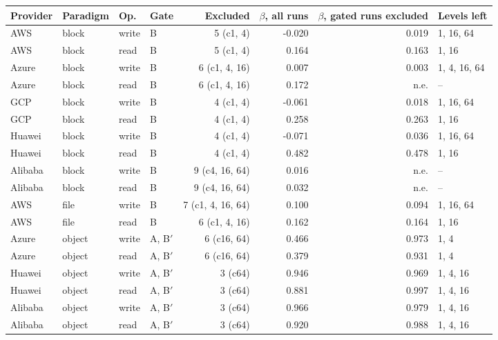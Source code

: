\begin{tabular}{llllrrrl}
\toprule
Provider & Paradigm & Op. & Gate & Excluded & $\beta$, all runs & $\beta$, gated runs excluded & Levels left \\
\midrule
AWS & block & write & B & 5 (c1, 4) & -0.020 & 0.019 & 1, 16, 64 \\
AWS & block & read & B & 5 (c1, 4) & 0.164 & 0.163 & 1, 16 \\
Azure & block & write & B & 6 (c1, 4, 16) & 0.007 & 0.003 & 1, 4, 16, 64 \\
Azure & block & read & B & 6 (c1, 4, 16) & 0.172 & n.e. & -- \\
GCP & block & write & B & 4 (c1, 4) & -0.061 & 0.018 & 1, 16, 64 \\
GCP & block & read & B & 4 (c1, 4) & 0.258 & 0.263 & 1, 16 \\
Huawei & block & write & B & 4 (c1, 4) & -0.071 & 0.036 & 1, 16, 64 \\
Huawei & block & read & B & 4 (c1, 4) & 0.482 & 0.478 & 1, 16 \\
Alibaba & block & write & B & 9 (c4, 16, 64) & 0.016 & n.e. & -- \\
Alibaba & block & read & B & 9 (c4, 16, 64) & 0.032 & n.e. & -- \\
AWS & file & write & B & 7 (c1, 4, 16, 64) & 0.100 & 0.094 & 1, 16, 64 \\
AWS & file & read & B & 6 (c1, 4, 16) & 0.162 & 0.164 & 1, 16 \\
Azure & object & write & A, B$'$ & 6 (c16, 64) & 0.466 & 0.973 & 1, 4 \\
Azure & object & read & A, B$'$ & 6 (c16, 64) & 0.379 & 0.931 & 1, 4 \\
Huawei & object & write & A, B$'$ & 3 (c64) & 0.946 & 0.969 & 1, 4, 16 \\
Huawei & object & read & A, B$'$ & 3 (c64) & 0.881 & 0.997 & 1, 4, 16 \\
Alibaba & object & write & A, B$'$ & 3 (c64) & 0.966 & 0.979 & 1, 4, 16 \\
Alibaba & object & read & A, B$'$ & 3 (c64) & 0.920 & 0.988 & 1, 4, 16 \\
\bottomrule
\end{tabular}
